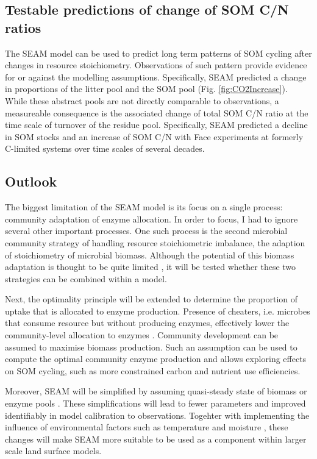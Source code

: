 \subsection{Testable predictions of change of SOM C/N ratios}
The SEAM model can be used to predict long term patterns of SOM cycling after
changes in resource stoichiometry. Observations of such pattern provide evidence
for or against the modelling assumptions.
Specifically, SEAM predicted a change in proportions of the litter pool and the
SOM pool (Fig. \ref{fig:CO2Increase}). While these abstract pools are not
directly comparable to observations, a measureable consequence is the associated
change of total SOM C/N ratio at the time scale of turnover of the residue
pool. Specifically, SEAM predicted a decline in SOM stocks and an increase of
SOM C/N with Face experiments at formerly C-limited systems over time scales of
several decades.
 
\subsection{Outlook} 
The biggest limitation of the SEAM model is its focus on a single process:
community adaptation of enzyme allocation. In order to focus, I had to ignore
several other important processes. One such process is the second microbial
community strategy of handling resource stoichiometric imbalance,
the adaption of stoichiometry of microbial biomass. Although the potential of this biomass
adaptation is thought to be quite limited \citep{Mooshammer14}, it will be
tested whether these two strategies can be combined within a model.

Next, the optimality principle will be extended to determine the proportion of
uptake that is allocated to enzyme production. Presence of cheaters, i.e.
microbes that consume resource but without producing enzymes, effectively lower
the community-level allocation to enzymes \citep{Kaiser14}. Community
development can be assumed to maximise biomass production. Such an assumption
can be used to compute the optimal community enzyme production and allows
exploring effects on SOM cycling, such as more constrained carbon and nutrient
use efficiencies.

Moreover, SEAM will be simplified by assuming quasi-steady state of biomass or
enzyme pools \citep{Wutzler13}. These simplifications will lead to fewer
parameters and improved identifiably in model calibration to observations.
Togehter with implementing the influence of environmental factors such as
temperature and moisture \citep{Davidson12}, these changes will make SEAM more
suitable to be used as a component within larger scale land surface models.
 

